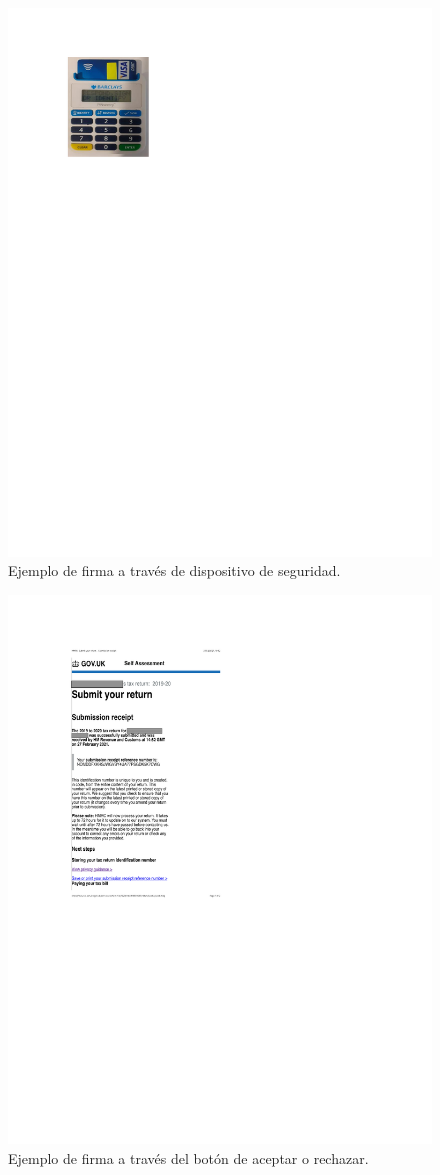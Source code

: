 \documentclass[12pt]{report} %
\begin{document}
\begin{figure}
\centering
\includegraphics[width=0.85\columnwidth]{imagenes/firmadispositivo.pdf}
\caption{Ejemplo de firma a través de dispositivo de seguridad.}
\label{Fig. Firmadispositivo}
\end{figure} 



\begin{figure}
\centering
\includegraphics[width=0.85\columnwidth]{imagenes/firmaclickwrap.pdf}
\caption{Ejemplo de firma a través del botón de aceptar o rechazar.}
\label{Fig. Firmaclickwrap}
\end{figure} 
\end{document}
